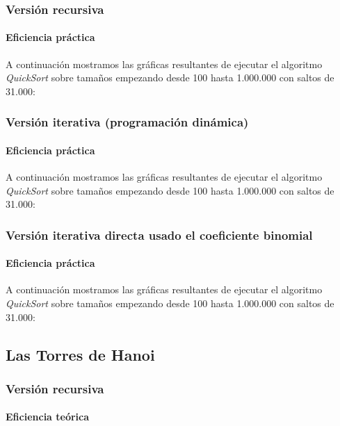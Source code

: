 \documentclass[a4paper,12pt]{article} %
\begin{document}
\subsubsection{Versión recursiva}

\paragraph{Eficiencia práctica}

A continuación mostramos las gráficas resultantes de ejecutar el algoritmo \textit{QuickSort} 
sobre tamaños empezando desde 100 hasta 1.000.000 con saltos de 31.000:

\subsubsection{Versión iterativa (programación dinámica)}
\paragraph{Eficiencia práctica}

A continuación mostramos las gráficas resultantes de ejecutar el algoritmo \textit{QuickSort} 
sobre tamaños empezando desde 100 hasta 1.000.000 con saltos de 31.000:

\subsubsection{Versión iterativa directa usado el coeficiente binomial}
\paragraph{Eficiencia práctica}

A continuación mostramos las gráficas resultantes de ejecutar el algoritmo \textit{QuickSort} 
sobre tamaños empezando desde 100 hasta 1.000.000 con saltos de 31.000:

\subsection{Las Torres de Hanoi}

\subsubsection{Versión recursiva}
\paragraph{Eficiencia teórica}
\end{document}
